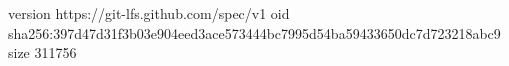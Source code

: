 version https://git-lfs.github.com/spec/v1
oid sha256:397d47d31f3b03e904eed3ace573444bc7995d54ba59433650dc7d723218abc9
size 311756
